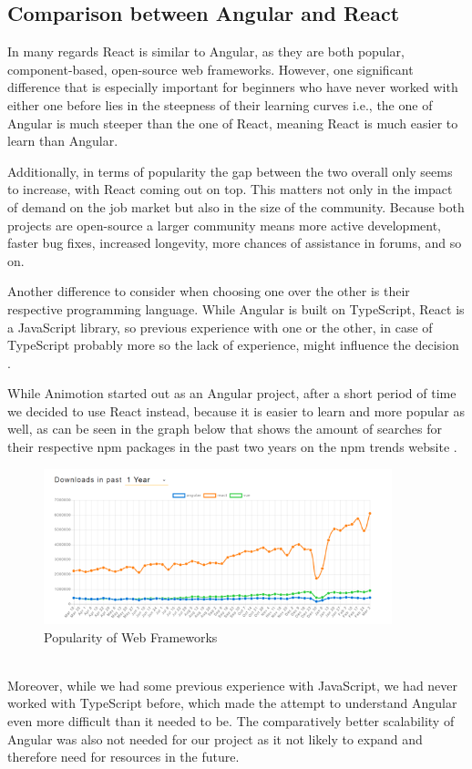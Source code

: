 \subsection{Comparison between Angular and React}
In many regards React is similar to Angular, as they are both popular, component-based, open-source web frameworks. However, one 
significant difference that is especially important for beginners who have never worked with either one before lies in the 
steepness of their learning curves i.e., the one of Angular is much steeper than the one of React, meaning React is much easier 
to learn than Angular.

Additionally, in terms of popularity the gap between the two overall only seems to increase, with React coming out on top. This 
matters not only in the impact of demand on the job market but also in the size of the community. Because both projects are 
open-source a larger community means more active development, faster bug fixes, increased longevity, more chances of assistance 
in forums, and so on.

Another difference to consider when choosing one over the other is their respective programming language. While Angular is built
on TypeScript, React is a JavaScript library, so previous experience with one or the other, in case of TypeScript probably
more so the lack of experience, might influence the decision \cite{AngularReactComparison}.

While Animotion started out as an Angular project, after a short period of time we decided to use React instead, because it 
is easier to learn and more popular as well, as can be seen in the graph below that shows the amount of searches for their 
respective npm packages in the past two years on the npm trends website \cite{AngularReactPopularity}.
\\
\begin{figure}[htb]
  \centering
  \includegraphics[width=0.9\textwidth]{pics/webframeworkpop.png}
  \caption{Popularity of Web Frameworks}
  \label{fig:webpop}
\end{figure}
\\
Moreover, while we had some previous experience with JavaScript, we had never worked with TypeScript before, which made the attempt 
to understand Angular even more difficult than it needed to be. The comparatively better scalability of Angular was also not needed
for our project as it not likely to expand and therefore need for resources in the future.

